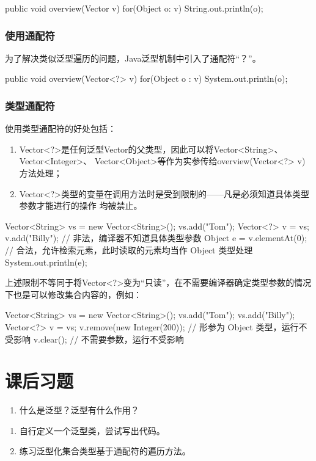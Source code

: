 \begin{javaCode}
  public void overview(Vector v) {
    for(Object o: v) {
      String.out.println(o);
    }
  }
\end{javaCode}

\subsubsection{使用通配符}

为了解决类似泛型遍历的问题，Java泛型机制中引入了通配符“？”。

\begin{javaCode}
  public void overview(Vector<?> v) {
    for(Object o : v) {
      System.out.println(o);
    }
  }
\end{javaCode}

\subsubsection{类型通配符}

使用类型通配符的好处包括：

\begin{enumerate}
\item Vector<?>是任何泛型Vector的父类型，因此可以将Vector<String>、Vector<Integer>、
  Vector<Object>等作为实参传给overview(Vector<?> v)方法处理；
\item Vector<?>类型的变量在调用方法时是受到限制的——凡是必须知道具体类型参数才能进行的操作
  均被禁止。
\end{enumerate}

\begin{javaCode}
  Vector<String> vs = new Vector<String>();
  vs.add("Tom");
  Vector<?> v = vs;
  v.add("Billy");  // 非法，编译器不知道具体类型参数
  Object e = v.elementAt(0); // 合法，允许检索元素，此时读取的元素均当作 Object 类型处理
  System.out.println(e);
\end{javaCode}

上述限制不等同于将Vector<?>变为“只读”，在不需要编译器确定类型参数的情况
下也是可以修改集合内容的，例如：
\begin{javaCode}
  Vector<String> vs = new Vector<String>();
  vs.add("Tom");
  vs.add("Billy");
  Vector<?> v = vs;
  v.remove(new Integer(200));  // 形参为 Object 类型，运行不受影响
  v.clear(); // 不需要参数，运行不受影响
\end{javaCode}

\section{课后习题}

\begin{enumerate}
\item 什么是泛型？泛型有什么作用？
\end{enumerate}

\begin{enumerate}
\item 自行定义一个泛型类，尝试写出代码。
\item 练习泛型化集合类型基于通配符的遍历方法。
\end{enumerate}